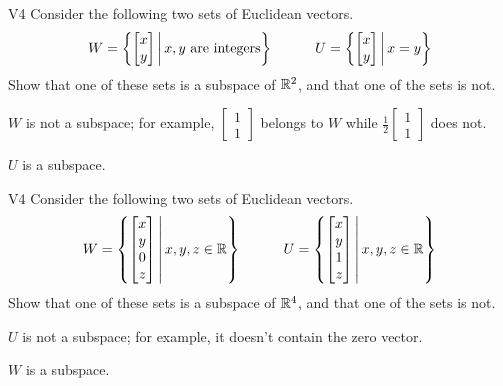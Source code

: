\begin{problem}{V4}
Consider the following two sets of Euclidean vectors.
\[
  W = \left\{\begin{bmatrix} x \\ y \end{bmatrix}\,\middle|\,x,y \text{ are integers}\right\}
\hspace{3em}
  U = \left\{\begin{bmatrix} x \\ y \end{bmatrix}\,\middle|\,x=y\right\}
\]
Show that one of these sets is a subspace of \(\mathbb{R}^2\), and
that one of the sets is not.
\end{problem}
\begin{solution}
\(W\) is not a subspace; for example, \(\begin{bmatrix} 1 \\ 1 \end{bmatrix}\)
belongs to \(W\) while \(\frac{1}{2}\begin{bmatrix} 1 \\ 1 \end{bmatrix}\)
does not.

\(U\) is a subspace.
\end{solution}

\begin{problem}{V4}
Consider the following two sets of Euclidean vectors.
\[
  W = \left\{\begin{bmatrix} x \\ y \\ 0 \\ z \end{bmatrix}\,\middle|\,x,y,z\in\mathbb{R}\right\}
\hspace{3em}
  U = \left\{\begin{bmatrix} x \\ y \\ 1 \\ z \end{bmatrix}\,\middle|\,x,y,z\in\mathbb{R}\right\}
\]
Show that one of these sets is a subspace of \(\mathbb{R}^4\), and
that one of the sets is not.
\end{problem}
\begin{solution}
\(U\) is not a subspace; for example, it doesn't contain the zero vector.

\(W\) is a subspace.
\end{solution}




